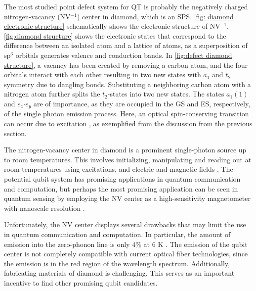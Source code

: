 The most studied point defect system for QT is probably the negatively charged nitrogen-vacancy (NV$^{-1}$) center in diamond, which is an SPS. \autoref{fig: diamond electronic structure} schematically shows the electronic structure of NV$^{-1}$. \autoref{fig:diamond structure} shows the electronic states that correspond to the difference between an isolated atom and a lattice of atoms, as a superposition of sp$^3$ orbitals generates valence and conduction bands.
In \autoref{fig:defect diamond structure}, a vacancy has been created by removing a carbon atom, and the four orbitals interact with each other resulting in two new states with $a_1$ and $t_2$ symmetry due to dangling bonds. Substituting a neighboring carbon atom with a nitrogen atom further splits the $t_2$-states into two new states.
The states $a_1(1)$ and $e_{x'}e_y$ are of importance, as they are occupied in the GS and ES, respectively, of the single photon emission process. Here, an optical spin-conserving transition can occur due to excitation \cite{Gordon2013}, as exemplified from the discussion from the previous section.

\noindent The nitrogen-vacancy center in diamond is a prominent single-photon source up to room temperatures. This involves initializing, manipulating and reading out at room temperatures using excitations, and electric and magnetic fields \cite{Gordon2013}. The potential qubit system has promising applications in quantum communication and computation, but
perhaps the most promising application can be seen in quantum sensing by employing the NV center as a high-sensitivity magnetometer with nanoscale resolution \cite{Taylor2008}.

Unfortunately, the NV center displays several drawbacks that may limit the use in quantum communication and computation. In particular, the amount of emission into the zero-phonon line is only $4 \%$ at $6$ K \cite{Barclay2011}. The emission of the qubit center is not completely compatible with current optical fiber technologies, since the emission is in the red region of the wavelength spectrum. Additionally, fabricating materials of diamond is challenging. This serves as an important incentive to find other promising qubit candidates.

